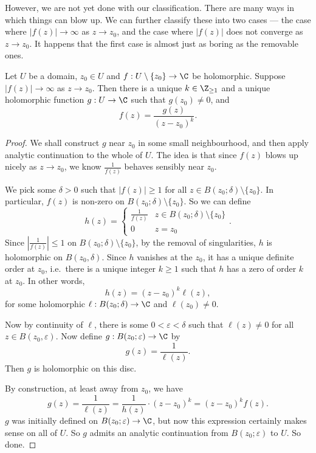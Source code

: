 \documentclass[a4paper]{article}
\begin{document}
However, we are not yet done with our classification. There are many ways in which things can blow up. We can further classify these into two cases --- the case where $|f(z)| \to \infty$ as $z \to z_0$, and the case where $|f(z)|$ does not converge as $z \to z_0$. It happens that the first case is almost just as boring as the removable ones.

\begin{prop}
  Let $U$ be a domain, $z_0 \in U$ and $f: U \setminus \{z_0\} \to \C$ be holomorphic. Suppose $|f(z)| \to \infty$ as $z \to z_0$. Then there is a unique $k \in \Z_{\geq 1}$ and a unique holomorphic function $g: U \to \C$ such that $g(z_0) \not= 0$, and
  \[
    f(z) = \frac{g(z)}{(z - z_0)^k}.
  \]
\end{prop}

\begin{proof}
  We shall construct $g$ near $z_0$ in some small neighbourhood, and then apply analytic continuation to the whole of $U$. The idea is that since $f(z)$ blows up nicely as $z \to z_0$, we know $\frac{1}{f(z)}$ behaves sensibly near $z_0$.

  We pick some $\delta > 0$ such that $|f(z)| \geq 1$ for all $z \in B(z_0; \delta) \setminus \{z_0\}$. In particular, $f(z)$ is non-zero on $B(z_0; \delta)\setminus \{z_0\}$. So we can define
  \[
    h(z) =
    \begin{cases}
      \frac{1}{f(z)} & z \in B(z_0; \delta) \setminus \{z_0\}\\
      0 & z = z_0
    \end{cases}.
  \]
  Since $|\frac{1}{f(z)}| \leq 1$ on $B(z_0; \delta) \setminus \{z_0\}$, by the removal of singularities, $h$ is holomorphic on $B(z_0, \delta)$. Since $h$ vanishes at the $z_0$, it has a unique definite order at $z_0$, i.e.\ there is a unique integer $k \geq 1$ such that $h$ has a zero of order $k$ at $z_0$. In other words,
  \[
    h(z) = (z - z_0)^k \ell(z),
  \]
  for some holomorphic $\ell: B(z_0; \delta) \to \C$ and $\ell(z_0) \not= 0$.

  Now by continuity of $\ell$, there is some $0 < \varepsilon < \delta$ such that $\ell (z) \not= 0$ for all $z \in B(z_0, \varepsilon)$. Now define $g: B(z_0; \varepsilon) \to \C$ by
  \[
    g(z) = \frac{1}{\ell(z)}.
  \]
  Then $g$ is holomorphic on this disc.

  By construction, at least away from $z_0$, we have
  \[
    g(z) = \frac{1}{\ell(z)} = \frac{1}{h(z)} \cdot (z - z_0)^k = (z - z_0)^k f(z).
  \]
  $g$ was initially defined on $B(z_0; \varepsilon) \to \C$, but now this expression certainly makes sense on all of $U$. So $g$ admits an analytic continuation from $B(z_0; \varepsilon)$ to $U$. So done.
\end{proof}
\end{document}
